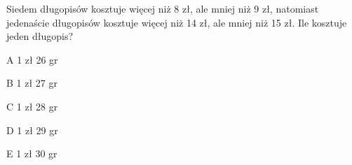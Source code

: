 \begin{tresc}
Siedem długopisów kosztuje więcej niż 8 zł, ale mniej niż 9 zł, natomiast jedenaście długopisów kosztuje więcej niż 14 zł, ale mniej niż 15 zł. Ile kosztuje jeden długopis?
\end{tresc}
\begin{wariant}{A} 1 zł 26 gr \end{wariant}
\begin{wariant}{B} 1 zł 27 gr \end{wariant}
\begin{wariant}{C} 1 zł 28 gr \end{wariant}
\begin{wariant}{D} 1 zł 29 gr \end{wariant}
\begin{wariant}{E} 1 zł 30 gr \end{wariant}
